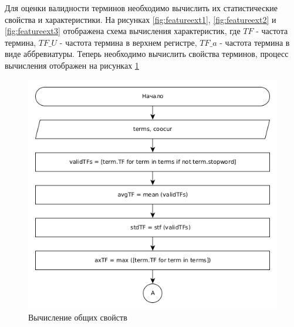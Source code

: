 Для оценки валидности терминов необходимо вычислить их статистические свойства и характеристики.
На рисунках \ref{fig:featureext1}, \ref{fig:featureext2} и \ref{fig:featureext3} отображена схема вычисления характеристик, где $TF$ - частота термина, $TF\_U$ - частота термина в верхнем регистре, $TF\_a$ - частота термина в виде аббревиатуры.
Теперь необходимо вычислить свойства терминов, процесс вычисления отображен на рисунках \ref{fig:calculate1}
\begin{figure}[!h]
	\centering
	\includegraphics[width=0.9\linewidth]{src/img/design/calculate_1}
	\caption{Вычисление общих свойств}
	\label{fig:calculate1}
\end{figure}

